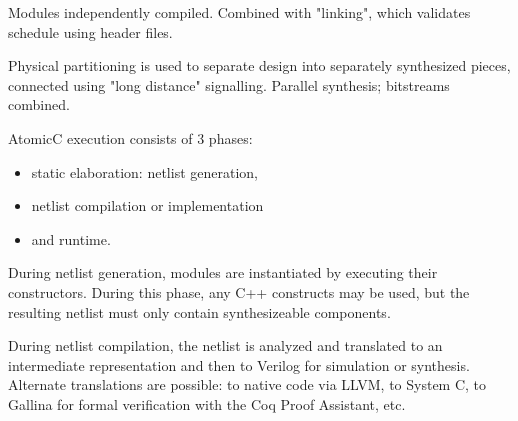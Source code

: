 Modules independently compiled.  Combined with "linking", which validates schedule using header files.

Physical partitioning is used to separate design into separately synthesized pieces, connected using
"long distance" signalling.  Parallel synthesis; bitstreams combined.

AtomicC execution consists of 3 phases:
\begin{itemize}
\item static elaboration: netlist generation, 
\item netlist compilation or implementation
\item and runtime.
\end{itemize}

During netlist
generation, modules are instantiated by executing their
constructors. During this phase, any C++ constructs may be used, but
the resulting netlist must only contain synthesizeable components.

During netlist compilation, the netlist is analyzed and translated to
an intermediate representation and then to Verilog for simulation or
synthesis. Alternate translations are possible: to native code via
LLVM, to System C, to Gallina for formal verification with the Coq
Proof Assistant, etc.
